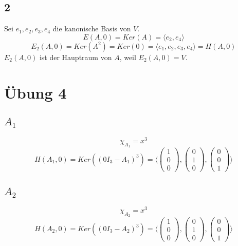 \documentclass[10pt,a4paper]{article}
\begin{document}
\subsection*{2}

Sei $e_{1}, e_{2}, e_{3}, e_{4}$ die kanonische Basis von $V$.
\begin{equation}
E(A, 0) = Ker(A) = \langle e_{2}, e_{4} \rangle
\end{equation}
\begin{equation}
E_{2}(A, 0) = Ker(A^{2}) = Ker(0) = \langle e_{1}, e_{2}, e_{3}, e_{4} \rangle = H(A, 0)
\end{equation}
$E_{2}(A, 0)$ ist der Hauptraum von $A$, weil $E_{2}(A, 0) = V$.

\section*{Übung 4}

\subsection*{$A_{1}$}

\begin{equation}
\chi_{A_{1}} = x^{3}
\end{equation}
\begin{equation}
H(A_{1}, 0) = Ker \left( (0I_{3} - A_{1})^{3} \right) = \langle
\begin{pmatrix}
1\\0\\0
\end{pmatrix},
\begin{pmatrix}
0\\1\\0
\end{pmatrix},
\begin{pmatrix}
0\\0\\1
\end{pmatrix}
\rangle
\end{equation}

\subsection*{$A_{2}$}

\begin{equation}
\chi_{A_{2}} = x^{3}
\end{equation}
\begin{equation}
H(A_{2}, 0) = Ker \left( (0I_{3} - A_{2})^{3} \right) = \langle
\begin{pmatrix}
1\\0\\0
\end{pmatrix},
\begin{pmatrix}
0\\1\\0
\end{pmatrix},
\begin{pmatrix}
0\\0\\1
\end{pmatrix}
\rangle
\end{equation}
\end{document}
